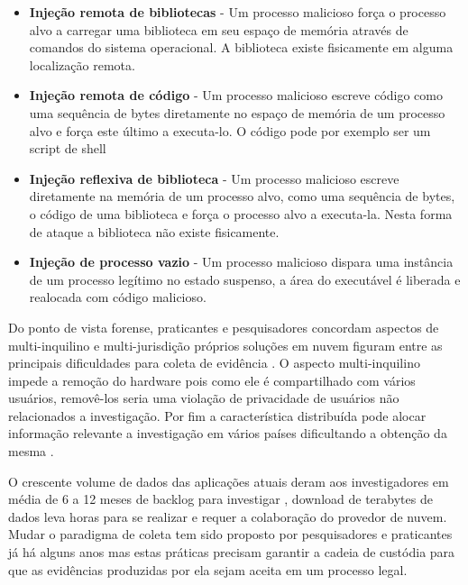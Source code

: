 \documentclass[
	12pt,				%
	openright,			%
	oneside,			%
	a4paper,			%
	english,			%
	brazil,				%
	]{abntex2}
\begin{document}
\begin{itemize}
 \item \textbf{Injeção remota de bibliotecas} - Um processo malicioso força o processo alvo a carregar uma biblioteca em seu espaço de memória através de comandos do sistema operacional.
 A biblioteca existe fisicamente em alguma localização remota.
 \item \textbf{Injeção remota de código} - Um processo malicioso escreve código como uma sequência de bytes diretamente no espaço de memória de um processo alvo e força este 
 último a executa-lo. O código pode por exemplo ser um script de shell
 \item \textbf{Injeção reflexiva de biblioteca} - Um processo malicioso escreve diretamente na memória de um processo alvo, como uma sequência de bytes, o código de uma biblioteca
 e força o processo alvo a executa-la. Nesta forma de ataque a biblioteca não existe fisicamente.
 \item \textbf{Injeção de processo vazio} - Um processo malicioso dispara uma instância de um processo legítimo no estado suspenso, a área do executável é liberada e realocada com 
 código malicioso.
\end{itemize}

Do ponto de vista forense, praticantes e pesquisadores concordam aspectos de multi-inquilino e multi-jurisdição próprios soluções em nuvem figuram entre as principais 
dificuldades para coleta de evidência \cite{Bash2015a}. O aspecto multi-inquilino impede a remoção do hardware pois como ele é compartilhado com vários usuários, 
removê-los seria uma violação de privacidade de usuários não relacionados a investigação. Por fim a característica distribuída pode alocar informação relevante a 
investigação em vários países dificultando a obtenção da mesma \cite{Dykstra2012a}.

O crescente volume de dados das aplicações atuais deram aos investigadores em média de 6 a 12 meses de backlog para investigar \cite{Quick2014}, download de terabytes
de dados leva horas para se realizar e requer a colaboração do provedor de nuvem. Mudar o paradigma de coleta tem sido proposto por pesquisadores e praticantes já há alguns
anos \cite{Birk2011}\cite{Sang2013} mas estas práticas precisam garantir a cadeia de custódia para que as evidências produzidas por ela sejam aceita em um processo legal.\\


\end{document}
